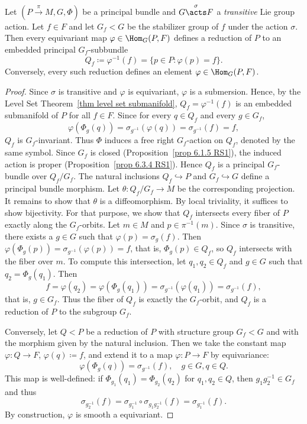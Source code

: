 \begin{prop}[{{\cite[Prop.~1.6.2]{RS2}}}]\label{prop 1.6.2 RS2}
    Let $(P\overset{\pi}{\to}M,G,\Phi)$ be a principal bundle and $G\overset{\sigma}{\acts}F$ a \emph{transitive} Lie group action. Let $f\in F$ and let $G_f< G$ be the stabilizer group of $f$ under the action $\sigma$. Then every equivariant map $\varphi\in\Hom_G(P,F)$ defines a reduction of $P$ to an embedded principal $G_f$-subbundle
    \[Q_f\coloneqq \varphi^{-1}(f)=\{p\in P:\varphi(p)=f\}.\]
    Conversely, every such reduction defines an element $\varphi\in \Hom_G(P,F)$.
\end{prop}
\begin{proof}
    Since $\sigma$ is transitive and $\varphi$ is equivariant, $\varphi$ is a submersion. Hence, by the Level Set Theorem~\ref{thm level set submanifold}, $Q_f=\varphi^{-1}(f)$ is an embedded submanifold of $P$ for all $f\in F$. Since for every $q\in Q_f$ and every $g\in G_f$,
    \[\varphi(\Phi_g(q))=\sigma_{g^{-1}}(\varphi(q))=\sigma_{g^{-1}}(f)=f,\]
    $Q_f$ is $G_f$-invariant. Thus $\Phi$ induces a free right $G_f$-action on $Q_f$, denoted by the same symbol. Since $G_f$ is closed (Proposition~\ref{prop 6.1.5 RS1}), the induced action is proper (Proposition~\ref{prop 6.3.4 RS1}). Hence $Q_f$ is a principal $G_f$-bundle over $Q_f\slash G_f$. The natural inclusions $Q_f\hookrightarrow P$ and $G_f\hookrightarrow G$ define a principal bundle morphism. Let $\theta:Q_f\slash G_f\to M$ be the corresponding projection. It remains to show that $\theta$ is a diffeomorphism. By local triviality, it suffices to show bijectivity. For that purpose, we show that $Q_f$ intersects every fiber of $P$ exactly along the $G_f$-orbits. Let $m\in M$ and $p\in\pi^{-1}(m)$. Since $\sigma$ is transitive, there exists a $g\in G$ such that $\varphi(p)=\sigma_g(f)$. Then $\varphi(\Phi_g(p))=\sigma_{g^{-1}}(\varphi(p))=f$, that is, $\Phi_g(p)\in Q_f$, so $Q_f$ intersects with the fiber over $m$. To compute this intersection, let $q_1,q_2\in Q_f$ and $g\in G$ such that $q_2=\Phi_g(q_1)$. Then
    \[f=\varphi(q_2)=\varphi(\Phi_g(q_1))=\sigma_{g^{-1}}(\varphi(q_1))=\sigma_{g^{-1}}(f),\]
    that is, $g\in G_f$. Thus the fiber of $Q_f$ is exactly the $G_f$-orbit, and $Q_f$ is a reduction of $P$ to the subgroup $G_f$.

    Conversely, let $Q<P$ be a reduction of $P$ with structure group $G_f<G$ and with the morphism given by the natural inclusion. Then we take the constant map $\varphi:Q\to F$, $\varphi(q)\coloneqq f$, and extend it to a map $\varphi:P\to F$ by equivariance:
    \[\varphi(\Phi_g(q))=\sigma_{g^{-1}}(f),\quad g\in G,q\in Q.\]
    This map is well-defined: if $\Phi_{g_1}(q_1)=\Phi_{g_2}(q_2)$ for $q_1,q_2\in Q$, then $g_1g_2^{-1}\in G_f$ and thus
    \[\sigma_{g_2^{-1}}(f)=\sigma_{g_1^{-1}}\circ\sigma_{g_1g_2^{-1}}(f)=\sigma_{g_1^{-1}}(f).\]
    By construction, $\varphi$ is smooth a equivariant.
\end{proof}

